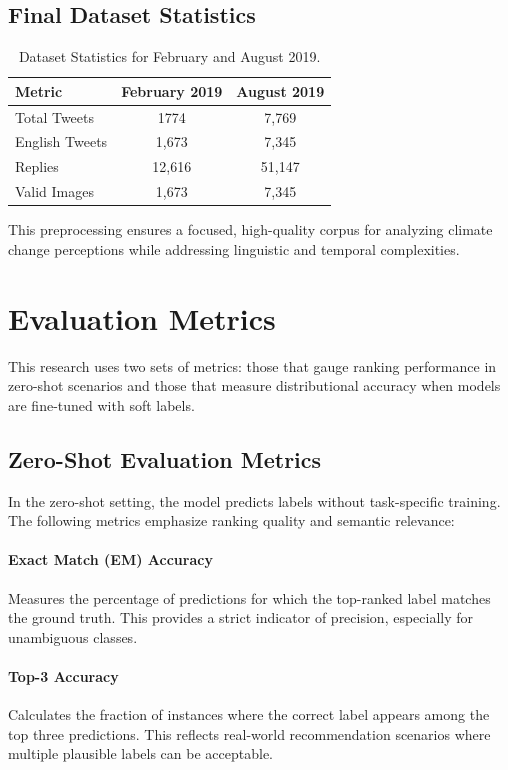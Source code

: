 \subsection{Final Dataset Statistics}
\begin{table}[h!]
\centering
\begin{tabular}{lcc}
\toprule
Metric                & February 2019 & August 2019 \\
\midrule
Total Tweets          & 1774          & 7,769      \\
English Tweets        & 1,673         & 7,345      \\
Replies               & 12,616        & 51,147     \\
Valid Images          & 1,673         & 7,345      \\
\bottomrule
\end{tabular}
\caption{Dataset Statistics for February and August 2019.}
\end{table}


This preprocessing ensures a focused, high-quality corpus for analyzing climate change perceptions while addressing linguistic and temporal complexities.

\section{Evaluation Metrics}

This research uses two sets of metrics: those that gauge ranking performance in zero-shot scenarios and those that measure distributional accuracy when models are fine-tuned with soft labels. 

\subsection{Zero-Shot Evaluation Metrics}
\label{subsec:zero-shot-metrics}

In the zero-shot setting, the model predicts labels without task-specific training. The following metrics emphasize ranking quality and semantic relevance:

\paragraph{Exact Match (EM) Accuracy}  
Measures the percentage of predictions for which the top-ranked label matches the ground truth. This provides a strict indicator of precision, especially for unambiguous classes.

\paragraph{Top-3 Accuracy}  
Calculates the fraction of instances where the correct label appears among the top three predictions. This reflects real-world recommendation scenarios where multiple plausible labels can be acceptable.

